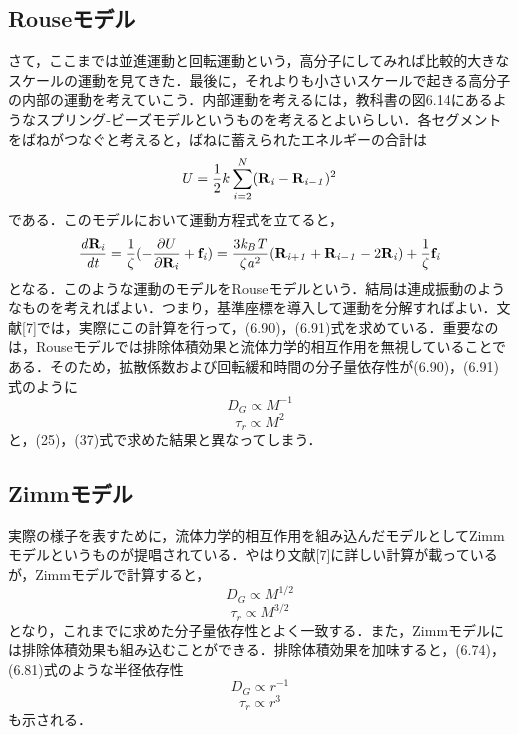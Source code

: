 \documentclass{jsarticle}
\begin{document}
\subsection{Rouseモデル}
さて，ここまでは並進運動と回転運動という，高分子にしてみれば比較的大きなスケールの運動を見てきた．最後に，それよりも小さいスケールで起きる高分子の内部の運動を考えていこう．内部運動を考えるには，教科書の図6.14にあるようなスプリング‐ビーズモデルというものを考えるとよいらしい．各セグメントをばねがつなぐと考えると，ばねに蓄えられたエネルギーの合計は
\begin{equation}
U=\frac{1}{2}k \sum_{i=2} ^{N}(\bf{R}_\mathit{i} -\bf{R}_\mathit{i-1})^\mathrm{2}
\end{equation}
である．このモデルにおいて運動方程式を立てると，
\begin{equation}
\frac{\mathit{d}\bf{R}_ \mathit{i}}{\mathit{d}t}=\frac{1}{\zeta}(-\frac{\partial U}{\partial \bf{R}_\mathit{i}}+\bf{f}_\mathit{i}) = \mathit{\frac{\mathrm{3}k_B T}{\zeta a^\mathrm{2}}}(\bf{R}_\mathit{i+1}+\bf{R}_\mathit{i-1}-\mathrm{2}\bf{R}_\mathit{i})+\frac{\mathrm{1}}{\zeta}\bf{f}_\mathit{i}
\end{equation}
となる．このような運動のモデルをRouseモデルという．結局は連成振動のようなものを考えればよい．つまり，基準座標を導入して運動を分解すればよい．文献[7]では，実際にこの計算を行って，(6.90)，(6.91)式を求めている．重要なのは，Rouseモデルでは排除体積効果と流体力学的相互作用を無視していることである．そのため，拡散係数および回転緩和時間の分子量依存性が(6.90)，(6.91)式のように
\begin{equation}
D_G \propto M^{-1}
\end{equation}
\begin{equation}
\tau _r \propto M^2
\end{equation}
と，(25)，(37)式で求めた結果と異なってしまう．

\subsection{Zimmモデル}
実際の様子を表すために，流体力学的相互作用を組み込んだモデルとしてZimmモデルというものが提唱されている．やはり文献[7]に詳しい計算が載っているが，Zimmモデルで計算すると，
\begin{equation}
D_G \propto M^{1/2}
\end{equation}
\begin{equation}
\tau _r \propto M^{3/2}
\end{equation}
となり，これまでに求めた分子量依存性とよく一致する．また，Zimmモデルには排除体積効果も組み込むことができる．排除体積効果を加味すると，(6.74)，(6.81)式のような半径依存性
\begin{equation}
D_G \propto r^{-1}
\end{equation}
\begin{equation}
\tau _r \propto r^3
\end{equation}
も示される．
\end{document}
